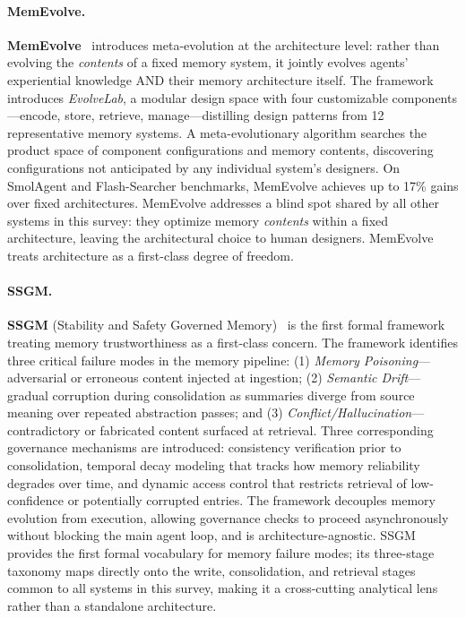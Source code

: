 \paragraph{MemEvolve.}
\textbf{MemEvolve}~\cite{memevolve2025} introduces meta-evolution at
the architecture level: rather than evolving the \emph{contents} of a
fixed memory system, it jointly evolves agents' experiential knowledge
AND their memory architecture itself.  The framework introduces
\emph{EvolveLab}, a modular design space with four customizable
components---encode, store, retrieve, manage---distilling design
patterns from 12 representative memory systems.  A meta-evolutionary
algorithm searches the product space of component configurations and
memory contents, discovering configurations not anticipated by any
individual system's designers.  On SmolAgent and Flash-Searcher
benchmarks, MemEvolve achieves up to 17\% gains over fixed
architectures.  MemEvolve addresses a blind spot shared by all other
systems in this survey: they optimize memory \emph{contents} within a
fixed architecture, leaving the architectural choice to human designers.
MemEvolve treats architecture as a first-class degree of freedom.

\paragraph{SSGM.}
\textbf{SSGM} (Stability and Safety Governed
Memory)~\cite{ssgm2026} is the first formal framework treating memory
trustworthiness as a first-class concern.  The framework identifies
three critical failure modes in the memory pipeline: (1) \emph{Memory
Poisoning}---adversarial or erroneous content injected at
ingestion; (2) \emph{Semantic Drift}---gradual corruption during
consolidation as summaries diverge from source meaning over repeated
abstraction passes; and (3) \emph{Conflict/Hallucination}---
contradictory or fabricated content surfaced at retrieval.  Three
corresponding governance mechanisms are introduced: consistency
verification prior to consolidation, temporal decay modeling that
tracks how memory reliability degrades over time, and dynamic access
control that restricts retrieval of low-confidence or potentially
corrupted entries.  The framework decouples memory evolution from
execution, allowing governance checks to proceed asynchronously without
blocking the main agent loop, and is architecture-agnostic.  SSGM
provides the first formal vocabulary for memory failure modes; its
three-stage taxonomy maps directly onto the write, consolidation, and
retrieval stages common to all systems in this survey, making it a
cross-cutting analytical lens rather than a standalone architecture.

